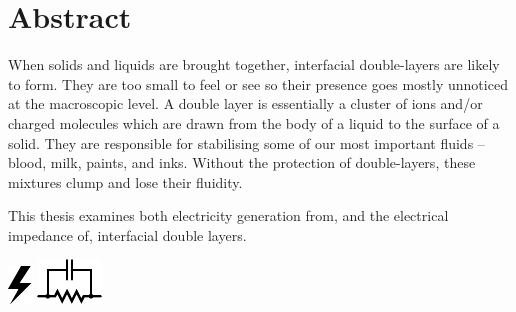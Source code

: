 





\rmfamily






\onehalfspacing
\chapter*{Abstract}
  When solids and liquids are brought together, interfacial double-layers are likely to form.
  They are too small to feel or see so their presence goes mostly unnoticed at the macroscopic level.
  A double layer is essentially a cluster of ions and/or charged molecules which are drawn from the body of a liquid to the surface of a solid.
  They are responsible for stabilising some of our most important fluids -- blood, milk, paints, and inks.
  Without the protection of double-layers, these mixtures clump and lose their fluidity.

  \vspace{-0.3cm}
  \begin{center}
    \parbox{8.8cm}{
      \begin{center}
        This thesis examines both electricity generation from, and the electrical impedance of, interfacial double layers.
      \end{center}
      \vspace{-1.35cm}
    }
    \vspace{-0.3cm}
    \parbox{15cm}{
        \hspace{0.8cm}
        \hbox{\vspace{-0.9cm}\includegraphics{graphics/logo_electricity}}
        \hbox{\hspace{9.8cm}\includegraphics{graphics/logo_impedance}}
    }
  \end{center}
  \vspace{0.5cm}

